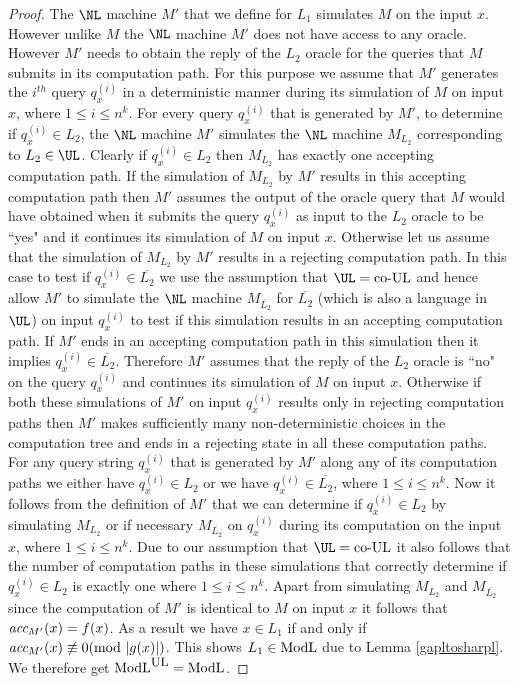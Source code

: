 \documentclass{amsbook}
\theoremstyle{definition}
\theoremstyle{remark}
\numberwithin{section}{chapter}
\numberwithin{equation}{chapter}
\newcommand{\coUL}{\mbox{\rm co-UL}}
\newcommand{\ULredn}{\mbox{\small{\rm UL}}}
\newcommand{\ModL}{\mbox{\rm ModL}}
\renewcommand{\mod}{\mbox{\textrm mod~}}
\newcommand{\acc}{\mbox{\it acc}}
\begin{document}
\begin{proof}
The $\NL$ machine $M'$ that we define for $L_1$ simulates $M$ on the input $x$. However unlike $M$ the $\NL$ machine $M'$ does not have access to any oracle. However $M'$ needs to obtain the reply of the $L_2$ oracle for the queries that $M$ submits in its computation path. For this purpose we assume that $M'$ generates the $i^{th}$ query $q_x^{(i)}$ in a deterministic manner during its simulation of $M$ on input $x$, where $1\leq i\leq n^k$. For every query $q_x^{(i)}$ that is generated by $M'$, to determine if $q_x^{(i)}\in L_2$, the $\NL$ machine $M'$  simulates the $\NL$ machine $M_{L_2}$ corresponding to $L_2\in \UL$. Clearly if $q_x^{(i)}\in L_2$ then $M_{L_2}$ has exactly one accepting computation path. If the simulation of $M_{L_2}$ by $M'$ results in this accepting computation path then $M'$ assumes the output of the oracle query that $M$ would have obtained when it submits the query $q_x^{(i)}$ as input to the $L_2$ oracle to be ``yes" and it continues its simulation of $M$ on input $x$. Otherwise let us assume that the simulation of $M_{L_2}$ by $M'$ results in a rejecting computation path. In this case to test if $q_x^{(i)}\in\overline{L_2}$ we use the assumption that $\UL =\coUL$ and hence allow $M'$ to simulate  the $\NL$ machine $M_{\overline{L_2}}$ for $\overline{L_2}$ (which is also a language in $\UL$) on input $q_x^{(i)}$ to test if this simulation results in an accepting computation path. If $M'$ ends in an accepting computation path in this simulation then it implies $q_x^{(i)}\in\overline{L_2}$. Therefore  $M'$ assumes that the reply of the $L_2$ oracle is ``no" on the query $q_x^{(i)}$ and continues its simulation of $M$ on input $x$. Otherwise if both these simulations of $M'$ on input $q_x^{(i)}$ results only in rejecting computation paths then $M'$ makes sufficiently many non-deterministic choices in the computation tree and ends in a rejecting state in all these computation paths. For any query string $q_x^{(i)}$ that is generated by $M'$ along any of its computation paths we either have $q_x^{(i)}\in L_2$ or we have $q_x^{(i)}\in\overline{L_2}$, where $1\leq i\leq n^k$. Now it follows from the definition of $M'$ that we can determine if $q_x^{(i)}\in L_2$ by simulating $M_{L_2}$ or if necessary $M_{\overline{L_2}}$ on $q_x^{(i)}$ during its computation on the input $x$, where $1\leq i\leq n^k$. Due to our assumption that $\UL =\coUL$ it also follows that the number of computation paths in these simulations that correctly determine if $q_x^{(i)}\in L_2$ is exactly one where $1\leq i\leq n^k$. Apart from simulating $M_{L_2}$ and $M_{\overline{L_2}}$ since the computation of $M'$ is identical to $M$ on input $x$ it follows that $\acc _{M'}(x)=f(x)$. As a result we have $x\in L_1$ if and only if $\acc_{M'}(x)\not\equiv 0(\mod |g(x)|)$. This shows $L_1\in\ModL$ due to Lemma \ref{gapltosharpl}. We therefore get $\ModL^{\ULredn}=\ModL$.
\end{proof}
\end{document}
